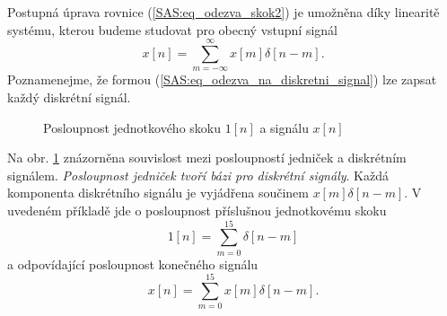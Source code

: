       Postupná úprava rovnice (\ref{SAS:eq_odezva_skok2}) je umožněna díky linearitě systému,
      kterou budeme studovat pro obecný vstupní signál
      \begin{equation}\label{SAS:eq_odezva_na_diskretni_signal}
        x[n]=\sum_{m=-\infty}^\infty x[m]\delta[n-m].
      \end{equation}
      Poznamenejme, že formou (\ref{SAS:eq_odezva_na_diskretni_signal}) lze zapsat každý diskrétní
      signál.

      \begin{figure}[ht!]
        \centering  
        \caption{Posloupnost jednotkového skoku \(1[n]\) a signálu \(x[n]\)}
        \label{tky:fig_006}
      \end{figure}
%      
      
      Na obr. \ref{tky:fig_006} znázorněna souvislost mezi posloupností jedniček a diskrétním
      sig\-ná\-lem. \emph{Posloupnost jedniček tvoří bázi pro diskrétní signály}. Každá komponenta
      diskrétního signálu je vyjádřena součinem $x[m]\delta[n-m]$. V uvedeném příkladě jde o
      posloupnost příslušnou jednotkovému skoku
      \begin{equation}\label{SAS:eq_odezva5}
        1[n]=\sum_{m=0}^{15}\delta[n-m]
      \end{equation}
      a odpovídající posloupnost konečného signálu
      \begin{equation}\label{SAS:eq_odezva6}
        x[n]=\sum_{m=0}^{15}x[m]\delta[n-m].
      \end{equation}
  
